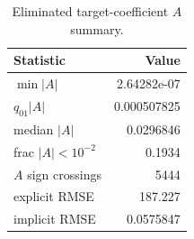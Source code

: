 \begin{table}[t]
\centering
\caption{Eliminated target-coefficient $A$ summary.}
\label{tab:d3d-A-summary}
\begin{tabular}{lr}
\hline
Statistic & Value \\
\hline
$\min|A|$ & 2.64282e-07 \\
$q_{01}|A|$ & 0.000507825 \\
median $|A|$ & 0.0296846 \\
frac $|A|<10^{-2}$ & 0.1934 \\
$A$ sign crossings & 5444 \\
explicit RMSE & 187.227 \\
implicit RMSE & 0.0575847 \\
\hline
\end{tabular}
\end{table}
